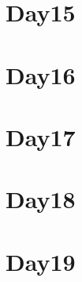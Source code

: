 
\section*{Day15}

\vfill
\section*{Day16}

\vfill
\section*{Day17}

\vfill
\section*{Day18}

\vfill
\section*{Day19}

\vfill
